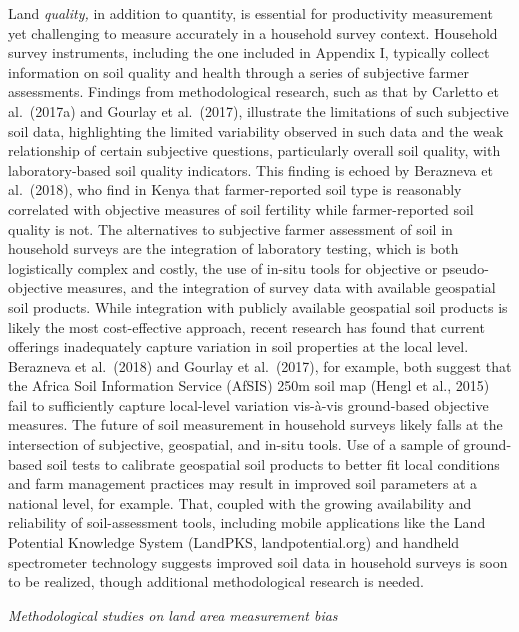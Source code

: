 \documentclass[
]{book}
\begin{document}
Land \emph{quality,} in addition to quantity, is essential for productivity measurement yet challenging to measure accurately in a household survey context. Household survey instruments, including the one included in Appendix I, typically collect information on soil quality and health through a series of subjective farmer assessments. Findings from methodological research, such as that by Carletto et al.~(2017a) and Gourlay et al.~(2017), illustrate the limitations of such subjective soil data, highlighting the limited variability observed in such data and the weak relationship of certain subjective questions, particularly overall soil quality, with laboratory-based soil quality indicators. This finding is echoed by Berazneva et al.~(2018), who find in Kenya that farmer-reported soil type is reasonably correlated with objective measures of soil fertility while farmer-reported soil quality is not. The alternatives to subjective farmer assessment of soil in household surveys are the integration of laboratory testing, which is both logistically complex and costly, the use of in-situ tools for objective or pseudo-objective measures, and the integration of survey data with available geospatial soil products. While integration with publicly available geospatial soil products is likely the most cost-effective approach, recent research has found that current offerings inadequately capture variation in soil properties at the local level. Berazneva et al.~(2018) and Gourlay et al.~(2017), for example, both suggest that the Africa Soil Information Service (AfSIS) 250m soil map (Hengl et al., 2015) fail to sufficiently capture local-level variation vis-à-vis ground-based objective measures. The future of soil measurement in household surveys likely falls at the intersection of subjective, geospatial, and in-situ tools. Use of a sample of ground-based soil tests to calibrate geospatial soil products to better fit local conditions and farm management practices may result in improved soil parameters at a national level, for example. That, coupled with the growing availability and reliability of soil-assessment tools, including mobile applications like the Land Potential Knowledge System (LandPKS, landpotential.org) and handheld spectrometer technology suggests improved soil data in household surveys is soon to be realized, though additional methodological research is needed.

\emph{Methodological studies on land area measurement bias}
\end{document}
